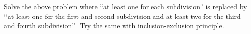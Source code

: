 Solve the above problem where \lq\lq at least one for each subdivision'' 
is replaced by
\lq\lq at least one for the first and second subdivision
and at least two for the third and fourth subdivision''. 
[Try the same with inclusion-exclusion
principle.]
